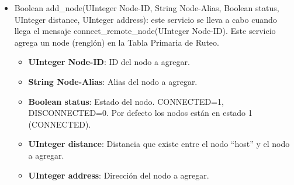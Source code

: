 \begin{itemize}
\item Boolean add\_node(UInteger Node-ID, String Node-Alias, Boolean status,
  UInteger distance, UInteger address): este servicio se lleva a cabo cuando
  llega el mensaje connect\_remote\_node(UInteger Node-ID). Este servicio
  agrega un node (renglón) en la Tabla Primaria de Ruteo.
  \begin{itemize}
  \item \textbf{UInteger Node-ID}: ID del nodo a agregar.
  \item \textbf{String Node-Alias}: Alias del nodo a agregar.
  \item \textbf{Boolean status}: Estado del nodo. CONNECTED=1, DISCONNECTED=0.
    Por defecto los nodos están en estado 1 (CONNECTED).
  \item \textbf{UInteger distance}: Distancia que existe entre el nodo
    ``host'' y el nodo a agregar.
  \item \textbf{UInteger address}: Dirección del nodo a agregar.
  \end{itemize}     
\end{itemize}



